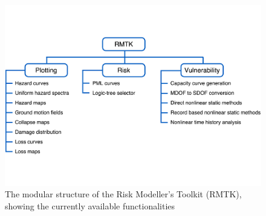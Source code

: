 \begin{figure}[!htbp]
	\centering
	\includegraphics[width=\textwidth]{figures/rmtk_structure.pdf}
	\caption{The modular structure of the Risk Modeller's Toolkit (RMTK), showing the currently available functionalities}
	\label{fig:rmtk-structure}
\end{figure}